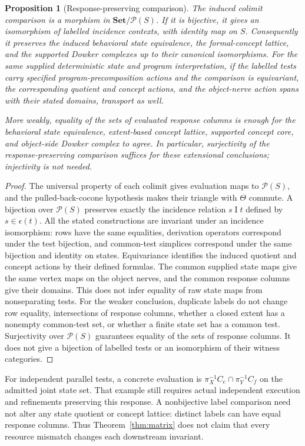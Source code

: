 \documentclass[11pt]{article}
\newtheorem{proposition}[theorem]{Proposition}
\theoremstyle{definition}\newtheorem{definition}[theorem]{Definition}
\theoremstyle{remark}\newtheorem{remark}[theorem]{Remark}
\newcommand{\Set}{\mathbf{Set}}
\begin{document}
\begin{proposition}[Response-preserving comparison]\label{prop:slice}
The induced colimit comparison is a morphism in $\Set/\mathcal P(S)$.
If it is bijective, it gives an isomorphism of labelled incidence contexts,
with identity map on $S$. Consequently it preserves the induced behavioral
state equivalence, the formal-concept lattice, and the supported Dowker
complexes up to their canonical isomorphisms. For the same supplied deterministic state and program interpretation, if the
labelled tests carry specified program-precomposition actions and the
comparison is equivariant, the corresponding quotient and concept actions,
and the object-nerve action spans with their stated domains, transport as well.

More weakly, equality of the sets of evaluated response columns is enough
for the behavioral state equivalence, extent-based concept lattice,
supported concept core, and object-side Dowker complex to agree. In
particular, surjectivity of the response-preserving comparison suffices
for these extensional conclusions; injectivity is not needed.
\end{proposition}
\begin{proof}
The universal property of each colimit gives evaluation maps to
$\mathcal P(S)$, and the pulled-back-cocone hypothesis makes their triangle
with $\Theta$ commute. A bijection over $\mathcal P(S)$ preserves exactly
the incidence relation $s\mathrel I t$ defined by $s\in\epsilon(t)$.
All the stated constructions are invariant under an incidence isomorphism:
rows have the same equalities, derivation operators correspond under the
test bijection, and common-test simplices correspond under the same
bijection and identity on states. Equivariance identifies the induced quotient and concept actions by their
defined formulas. The common supplied state maps give the same vertex maps
on the object nerves, and the common response columns give their domains.
This does not infer equality of raw state maps from nonseparating tests.
For the weaker conclusion, duplicate labels do not change row equality,
intersections of response columns, whether a closed extent has a
nonempty common-test set, or whether a finite state set has a common
test. Surjectivity over $\mathcal P(S)$ guarantees equality of the
sets of response columns. It does not give a bijection of labelled tests
or an isomorphism of their witness categories.
\end{proof}

For independent parallel tests, a concrete evaluation is
$\pi_X^{-1}C_e\cap\pi_Y^{-1}C_f$ on the admitted joint state set.
That example still requires actual independent execution and refinements
preserving this response. A nonbijective label comparison need not alter
any state quotient or concept lattice: distinct labels can have equal
response columns. Thus Theorem~\ref{thm:matrix} does not claim that every
resource mismatch changes each downstream invariant.
\end{document}
